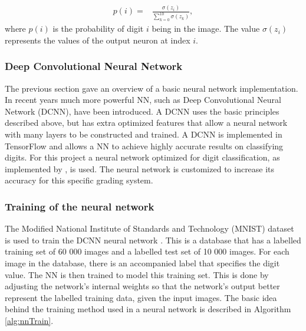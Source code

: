 
\begin{align}
  p(i) =  &\displaystyle{\frac{\sigma(z_{i})}{\sum_{k=0}^{10} \sigma(z_{k})}},
\label{eqn:normal}
\end{align}
where $p(i)$ is the probability of digit $i$ being in the image. The value $\sigma(z_{i})$ represents the values of the output neuron at index $i$.

\subsubsection{Deep Convolutional Neural Network}

The previous section gave an overview of a basic neural network implementation. In recent years much more powerful NN, such as Deep Convolutional Neural Network (DCNN), have been introduced. A DCNN uses the basic principles described above, but has extra optimized features that allow a neural network with many layers to be constructed and trained. A DCNN is implemented in TensorFlow \citep{Tensor} and allows a NN to achieve highly accurate results on classifying digits. For this project a neural network optimized for digit classification, as implemented by \citet{Tensor}, is used. The neural network is customized to increase its accuracy for this specific grading system.
\subsubsection{Training of the neural network}
\label{sec:trainNN}
The Modified National Institute of Standards and Technology (MNIST) dataset is used to train the DCNN neural network \citep{mnist}. This is a database that has a labelled training set of 60 000 images and a labelled test set of 10 000 images. For each image in the database, there is an accompanied label that specifies the digit value. The NN is then trained to model this training set. This is done by adjusting the network's internal weights so that the network's output better represent the labelled training data, given the input images. The basic idea behind the training method used in a neural network is described in Algorithm \ref{alg:nnTrain}.

